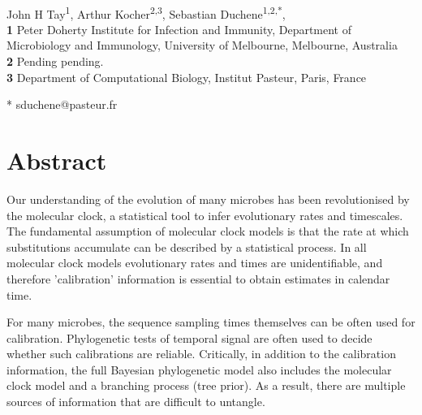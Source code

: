\documentclass[10pt,letterpaper]{article}
\begin{document}
\vspace*{0.2in}

\begin{flushleft}
{\Large
\textbf{} %
}
\newline
\\
John H Tay\textsuperscript{1},
Arthur Kocher\textsuperscript{2,3},
Sebastian Duchene\textsuperscript{1,2,*},
\\
\bigskip
\textbf{1} Peter Doherty Institute for Infection and Immunity, Department of Microbiology and Immunology, University of Melbourne, Melbourne, Australia
\\
\textbf{2} Pending pending.
\\
\textbf{3} Department of Computational Biology, Institut Pasteur, Paris, France
\\
\bigskip

% 


* sduchene@pasteur.fr

\end{flushleft}
\section*{Abstract}
Our understanding of the evolution of many microbes has been revolutionised by the molecular clock, a statistical tool to infer evolutionary rates and timescales. The fundamental assumption of molecular clock models is that the rate at which substitutions accumulate can be described by a statistical process. In all molecular clock models evolutionary rates and times are unidentifiable, and therefore 'calibration' information is essential to obtain estimates in calendar time.

For many microbes, the sequence sampling times themselves can be often used for calibration. Phylogenetic tests of temporal signal are often used to decide whether such calibrations are reliable. Critically, in addition to the calibration information, the full Bayesian phylogenetic model also includes the molecular clock model and a branching process (tree prior). As a result, there are multiple sources of information that are difficult to untangle.
\end{document}
